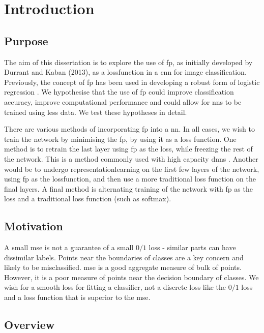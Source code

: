 \chapter{Introduction}

\section{Purpose}

The aim of this dissertation is to explore the use of  \gls{fp}, as initially developed by Durrant and Kaban (2013)\cite{durrant2013sharp}, as a \gls{lossfunction} in a \gls{cnn} for image classification. Previously, the concept of  \gls{fp} has been used in developing a robust form of logistic regression \cite{label_noise}. We hypothesise that the use of  \gls{fp} could improve classification accuracy, improve computational performance and could allow for \gls{nn}s to be trained using less data. We test these hypotheses in detail. \bigskip

There are various methods of incorporating  \gls{fp} into a  \gls{nn}. In all cases, we wish to train the network by minimising the  \gls{fp}, by using it as a loss function. One method is to retrain the last layer using  \gls{fp} as the loss, while freezing the rest of the network. This is a method commonly used with high capacity \gls{dnn}s \cite{transfer_learning}. Another would be to undergo \gls{representationlearning} on the first few \gls{layer}s of the network, using  \gls{fp} as the \gls{lossfunction}, and then use a more traditional loss function on the final layers. A final method is alternating training of the network with  \gls{fp} as the loss and a traditional loss function (such as \gls{softmax}). 

\section{Motivation}

A small  \gls{mse} is not a guarantee of a small $0/1$ loss - similar parts can have dissimilar labels. Points near the boundaries of classes are a key concern and likely to be misclassified.  \gls{mse} is a good aggregate measure of bulk of points. However, it is a poor measure of points near the decision boundary of classes. We wish for a smooth loss for fitting a classifier, not a discrete loss like the $0/1$ loss and a loss function that is superior to the  \gls{mse}.

\section{Overview}

